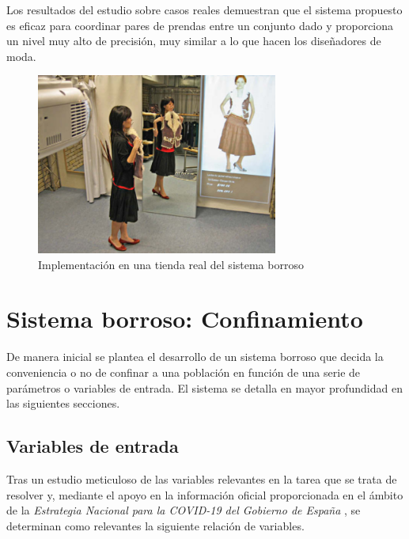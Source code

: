 \documentclass[12pt,a4paper, xcolor=table]{article}
\begin{document}
\vspace{2mm}

Los resultados del estudio sobre casos reales demuestran que el sistema propuesto es eficaz para coordinar pares de prendas entre un conjunto dado y proporciona un nivel muy alto de precisión, muy similar a lo que hacen los diseñadores de moda.

\begin{figure}[!h]
    \centering
    \includegraphics[width=300px]{img/fuzzy_shop.png}
    \caption{Implementación en una tienda real del sistema borroso\cite{fuzzyfashion}}
    \label{fuzzy_shop}
\end{figure}

\newpage

\section{Sistema borroso: Confinamiento}
De manera inicial se plantea el desarrollo de un sistema borroso que decida la conveniencia o no de confinar a una población en función de una serie de parámetros o variables de entrada. El sistema se detalla en mayor profundidad en las siguientes secciones.

\subsection{Variables de entrada}
Tras un estudio meticuloso de las variables relevantes en la tarea que se trata de resolver y, mediante el apoyo en la información oficial proporcionada en el ámbito de la \textit{Estrategia Nacional para la COVID-19 del Gobierno de España} \cite{poblacion}, se determinan como relevantes la siguiente relación de variables.
\end{document}
